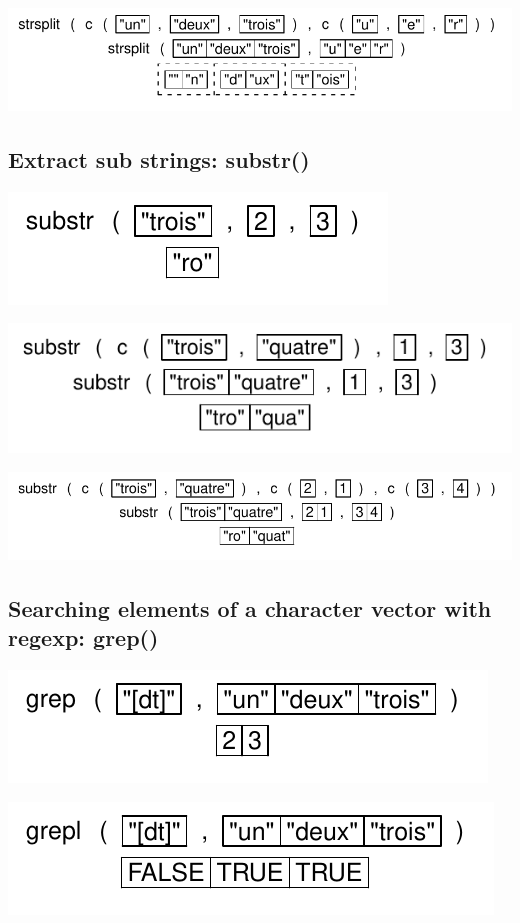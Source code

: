 \documentclass[pdflatex]{article}
\begin{document}
\includegraphics{strsplit_2.pdf}

\subsection{Extract sub strings: substr()}

\includegraphics{substr.pdf}

\includegraphics{substr_2.pdf}

\includegraphics{substr_3.pdf}

\subsection{Searching elements of a character vector with regexp: grep()}

\includegraphics{grep}

\includegraphics{grepl}
\end{document}
